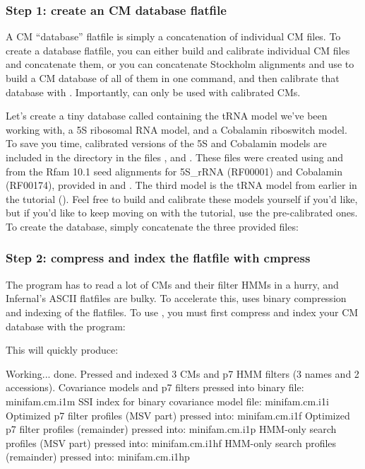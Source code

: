 \subsubsection{Step 1: create an CM database flatfile}

A CM ``database'' flatfile is simply a concatenation of individual CM
files. To create a database flatfile, you can either build and
calibrate individual CM files and concatenate them, or you can
concatenate Stockholm alignments and use  to build a CM
database of all of them in one command, and then calibrate that
database with . Importantly,  can only
be used with calibrated CMs.

Let's create a tiny database called  containing the
tRNA model we've been working with, a 5S ribosomal RNA model, and a
Cobalamin riboswitch model. To save you time, calibrated versions of
the 5S and Cobalamin models are included in the 
directory in the files , and
. These files were created using 
and  from the Rfam 10.1 seed alignments for 5S\_rRNA
(RF00001) and Cobalamin (RF00174), provided in
 and . The
third model is the tRNA model from earlier in the tutorial 
(). Feel free to build and calibrate these
models yourself if you'd like, but if you'd like to keep moving on
with the tutorial, use the pre-calibrated ones. To create the database,
simply concatenate the three provided files:


\subsubsection{Step 2: compress and index the flatfile with cmpress}

The  program has to read a lot of CMs and their filter
HMMs in a hurry, and Infernal's ASCII flatfiles are bulky. To
accelerate this,  uses binary compression and indexing of
the flatfiles. To use , you must first compress and
index your CM database with the  program:


This will quickly produce:

\begin{sreoutput}
Working...    done.
Pressed and indexed 3 CMs and p7 HMM filters (3 names and 2 accessions).
Covariance models and p7 filters pressed into binary file:  minifam.cm.i1m
SSI index for binary covariance model file:                 minifam.cm.i1i
Optimized p7 filter profiles (MSV part)  pressed into:      minifam.cm.i1f
Optimized p7 filter profiles (remainder) pressed into:      minifam.cm.i1p
HMM-only search profiles (MSV part)  pressed into:          minifam.cm.i1hf
HMM-only search profiles (remainder) pressed into:          minifam.cm.i1hp
\end{sreoutput}


